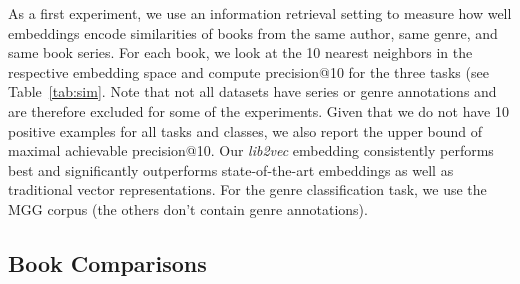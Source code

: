 \documentclass[11pt]{article}
\begin{document}

As a first experiment, we use an information retrieval setting to measure how well embeddings encode similarities of books from the same author, same genre, and same book series.
For each book, we look at the 10 nearest neighbors in the respective embedding space and compute precision@10 for the three tasks (see Table~\ref{tab:sim}.
Note that not all datasets have series or genre annotations and are therefore excluded for some of the experiments.
Given that we do not have 10 positive examples for all tasks and classes, we also report the upper bound of maximal achievable precision@10.
Our \emph{lib2vec} embedding consistently performs best and significantly outperforms state-of-the-art embeddings as well as traditional vector representations.
For the genre classification task, we use the MGG corpus (the others don't contain genre annotations).

\subsection{Book Comparisons}\label{ssec:bookComparisons}
\end{document}
